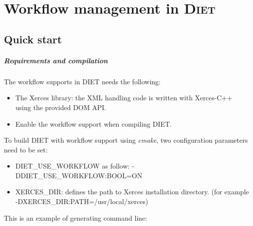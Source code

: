 
\chapter{Workflow management in \textsc{Diet}}

\section{Quick start}


\paragraph{Requirements and compilation}

The workflow supports in \textsc{DIET} needs the following:

\begin{itemize}
\item The Xerces library: the XML handling code is written with
  Xerces-C++ using the provided DOM API.
\item Enable the workflow support when compiling DIET.
\end{itemize}

To build DIET with workflow support using \textit{cmake}, two
configuration parameters need to be set:

\begin{itemize}
\item DIET\_USE\_WORKFLOW as follow: -DDIET\_USE\_WORKFLOW:BOOL=ON
\item XERCES\_DIR: defines the path to Xerces installation directory.
  (for example -DXERCES\_DIR:PATH=/usr/local/xerces)
\end{itemize}

This is an example of generating command line:

